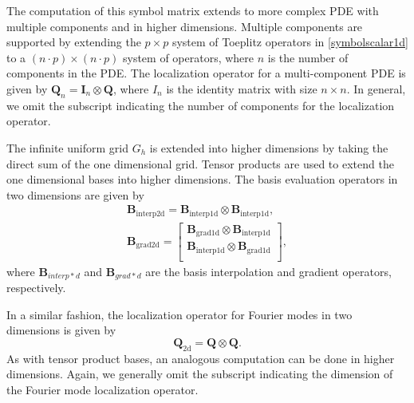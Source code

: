 \documentclass[review]{siamart190516}
\begin{document}
The computation of this symbol matrix extends to more complex PDE with multiple components and in higher dimensions.
Multiple components are supported by extending the $p \times p$ system of Toeplitz operators in \cref{symbolscalar1d} to a $\left( n \cdot p \right) \times \left( n \cdot p \right)$ system of operators, where $n$ is the number of components in the PDE.
The localization operator for a multi-component PDE is given by $\mathbf{Q}_n = \mathbf{I}_n \otimes \mathbf{Q}$, where $I_n$ is the identity matrix with size $n \times n$.
In general, we omit the subscript indicating the number of components for the localization operator.

The infinite uniform grid $G_h$ is extended into higher dimensions by taking the direct sum of the one dimensional grid.
Tensor products are used to extend the one dimensional bases into higher dimensions.
The basis evaluation operators in two dimensions are given by
\begin{equation}
\begin{split}
\mathbf{B}_{\text{interp2d}} = \mathbf{B}_{\text{interp1d}} \otimes \mathbf{B}_{\text{interp1d}}, \\
\mathbf{B}_{\text{grad2d}} =
\begin{bmatrix}
    \mathbf{B}_{\text{grad1d}} \otimes \mathbf{B}_{\text{interp1d}} \\
    \mathbf{B}_{\text{interp1d}} \otimes \mathbf{B}_{\text{grad1d}} \\
\end{bmatrix},
\end{split}
\end{equation}
where $\mathbf{B}_{interp*d}$ and $\mathbf{B}_{grad*d}$ are the basis interpolation and gradient operators, respectively.

In a similar fashion, the localization operator for Fourier modes in two dimensions is given by
\begin{equation}
\mathbf{Q}_{\text{2d}} = \mathbf{Q} \otimes \mathbf{Q}.
\end{equation}
As with tensor product bases, an analogous computation can be done in higher dimensions.
Again, we generally omit the subscript indicating the dimension of the Fourier mode localization operator.
\end{document}
